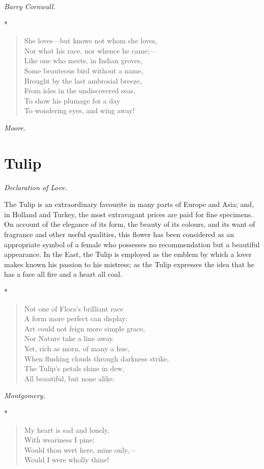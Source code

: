 \documentclass[11pt,twoside]{article}
\newcommand\flower[2]{\section*{#1}\addcontentsline{toc}{section}{#1}%
  \noindent\textit{#2.}\par\medskip}
\newcommand\stars{\begin{center}*\quad*\quad*\end{center}}
\newcommand\by[1]{\par\hfill\textit{#1}\par}
\begin{document}
\by{Barry Cornwall.}

\stars

\begin{verse}
She loves---but knows not whom she loves,\\
\quad Nor what his race, nor whence he came;---\\
Like one who meets, in Indian groves,\\
\quad Some beauteous bird without a name,\\
Brought by the last ambrosial breeze,\\
From isles in the undiscovered seas,\\
To show his plumage for a day\\
To wondering eyes, and wing away!
\end{verse}

\by{Moore.}

\flower{Tulip}{Declaration of Love}

The Tulip is an extraordinary favourite in many parts of Europe and Asia; and, in Holland and Turkey, the most extravagant prices are paid for fine specimens. On account of the elegance of its form, the beauty of its colours, and its want of fragrance and other useful qualities, this flower has been considered as an appropriate symbol of a female who possesses no recommendation but a beautiful appearance. In the East, the Tulip is employed as the emblem by which a lover makes known his passion to his mistress; as the Tulip expresses the idea that he has a face all fire and a heart all coal.

\stars

\begin{verse}
Not one of Flora’s brilliant race\\
\quad A form more perfect can display:\\
Art could not feign more simple grace,\\
\quad Nor Nature take a line away.\\
Yet, rich as morn, of many a hue,\\
\quad When flushing clouds through darkness strike,\\
The Tulip’s petals shine in dew,\\
\quad All beautiful, but none alike.
\end{verse}

\by{Montgomery.}

\stars

\begin{verse}
My heart is sad and lonely,\\
\quad With weariness I pine;\\
Would thou wert here, mine only,---\\
\quad Would I were wholly thine!
\end{verse}
\end{document}
